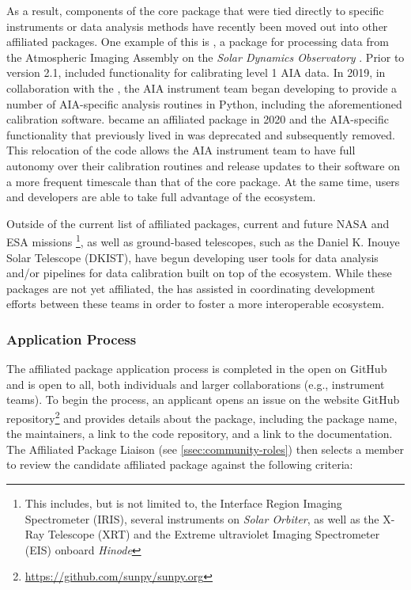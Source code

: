 As a result, components of the \sunpypkg core package that were tied directly to specific instruments or data analysis methods have recently been moved out into other affiliated packages.
One example of this is \aiapypkg, a package for processing data from the Atmospheric Imaging Assembly \citep[AIA,][]{lemen_atmospheric_2012} on the \textit{Solar Dynamics Observatory} \citep[SDO,][]{pesnell_solar_2012}.
Prior to version 2.1, \sunpypkg included functionality for calibrating level 1 AIA data.
In 2019, in collaboration with the \sunpyproj, the AIA instrument team began developing \aiapypkg to provide a number of AIA-specific analysis routines in Python, including the aforementioned calibration software.
\aiapypkg became an affiliated package in 2020 and the AIA-specific functionality that previously lived in \sunpypkg was deprecated and subsequently removed.
This relocation of the code allows the AIA instrument team to have full autonomy over their calibration routines and release updates to their software on a more frequent timescale than that of the \sunpypkg core package.
At the same time, \aiapypkg users and developers are able to take full advantage of the \sunpyproj ecosystem.

Outside of the current list of affiliated packages, current and future NASA and ESA missions \footnote{This includes, but is not limited to, the Interface Region Imaging Spectrometer (IRIS), several instruments on \textit{Solar Orbiter}, as well as the X-Ray Telescope (XRT) and the Extreme ultraviolet Imaging Spectrometer (EIS) onboard \textit{Hinode}}, as well as ground-based telescopes, such as the Daniel K. Inouye Solar Telescope (DKIST), have begun developing user tools for data analysis and/or pipelines for data calibration built on top of the \sunpy ecosystem.
While these packages are not yet affiliated, the \sunpyproj has assisted in coordinating development efforts between these teams in order to foster a more interoperable ecosystem.

\subsubsection{Application Process}
\label{sssec:application-process}

The affiliated package application process is completed in the open on GitHub and is open to all, both individuals and larger collaborations (e.g., instrument teams).
To begin the process, an applicant opens an issue on the \sunpyproj website GitHub repository\footnote{\url{https://github.com/sunpy/sunpy.org}} and provides details about the package, including the package name, the maintainers, a link to the code repository, and a link to the documentation.
The Affiliated Package Liaison (see \autoref{ssec:community-roles}) then selects a \sunpyproj member to review the candidate affiliated package against the following criteria:

